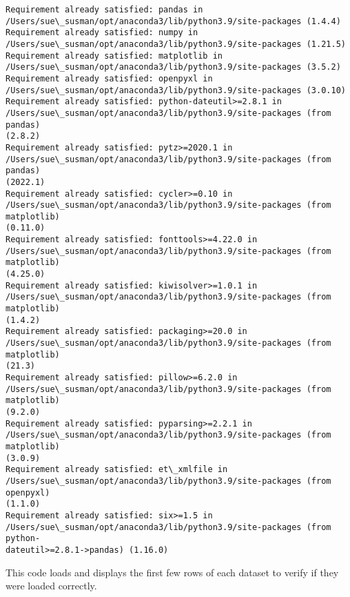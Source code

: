 \documentclass[11pt]{article}
\begin{document}
    \begin{Verbatim}[commandchars=\\\{\}]
Requirement already satisfied: pandas in
/Users/sue\_susman/opt/anaconda3/lib/python3.9/site-packages (1.4.4)
Requirement already satisfied: numpy in
/Users/sue\_susman/opt/anaconda3/lib/python3.9/site-packages (1.21.5)
Requirement already satisfied: matplotlib in
/Users/sue\_susman/opt/anaconda3/lib/python3.9/site-packages (3.5.2)
Requirement already satisfied: openpyxl in
/Users/sue\_susman/opt/anaconda3/lib/python3.9/site-packages (3.0.10)
Requirement already satisfied: python-dateutil>=2.8.1 in
/Users/sue\_susman/opt/anaconda3/lib/python3.9/site-packages (from pandas)
(2.8.2)
Requirement already satisfied: pytz>=2020.1 in
/Users/sue\_susman/opt/anaconda3/lib/python3.9/site-packages (from pandas)
(2022.1)
Requirement already satisfied: cycler>=0.10 in
/Users/sue\_susman/opt/anaconda3/lib/python3.9/site-packages (from matplotlib)
(0.11.0)
Requirement already satisfied: fonttools>=4.22.0 in
/Users/sue\_susman/opt/anaconda3/lib/python3.9/site-packages (from matplotlib)
(4.25.0)
Requirement already satisfied: kiwisolver>=1.0.1 in
/Users/sue\_susman/opt/anaconda3/lib/python3.9/site-packages (from matplotlib)
(1.4.2)
Requirement already satisfied: packaging>=20.0 in
/Users/sue\_susman/opt/anaconda3/lib/python3.9/site-packages (from matplotlib)
(21.3)
Requirement already satisfied: pillow>=6.2.0 in
/Users/sue\_susman/opt/anaconda3/lib/python3.9/site-packages (from matplotlib)
(9.2.0)
Requirement already satisfied: pyparsing>=2.2.1 in
/Users/sue\_susman/opt/anaconda3/lib/python3.9/site-packages (from matplotlib)
(3.0.9)
Requirement already satisfied: et\_xmlfile in
/Users/sue\_susman/opt/anaconda3/lib/python3.9/site-packages (from openpyxl)
(1.1.0)
Requirement already satisfied: six>=1.5 in
/Users/sue\_susman/opt/anaconda3/lib/python3.9/site-packages (from python-
dateutil>=2.8.1->pandas) (1.16.0)
    \end{Verbatim}

    This code loads and displays the first few rows of each dataset to
verify if they were loaded correctly.
\end{document}
